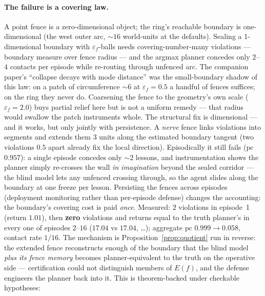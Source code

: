 \documentclass[11pt]{article}
\theoremstyle{remark}
\begin{document}
\paragraph{The failure is a covering law.} A point fence is a
zero-dimensional object; the ring's reachable boundary is one-dimensional
(the west outer arc, ${\sim}16$ world-units at the defaults). Sealing a
1-dimensional boundary with $\varepsilon_f$-balls needs
covering-number-many violations --- boundary measure over fence radius ---
and the argmax planner concedes only $2$--$4$ contacts per episode while
re-routing through unfenced arc. The companion paper's ``collapse decays
with mode distance'' was the small-boundary shadow of this law: on a patch
of circumference ${\sim}6$ at $\varepsilon_f = 0.5$ a handful of fences
suffices; on the ring they never do. Coarsening the fence to the geometry's
own scale ($\varepsilon_f = 2.0$) buys partial relief here but is not a
uniform remedy --- that radius would swallow the patch instruments whole.
The structural fix is dimensional --- and it works, but only jointly with
persistence. A \emph{nerve} fence links violations into segments and
extends them $3$ units along the estimated boundary tangent (two violations
$0.5$ apart already fix the local direction). Episodically it still fails
($\mathrm{pc}$ $0.957$): a single episode concedes only ${\sim}2$ lessons,
and instrumentation shows the planner simply re-crosses the wall
\emph{in imagination} beyond the sealed corridor --- the blind model lets
any unfenced crossing through, so the agent slides along the boundary at
one freeze per lesson. Persisting the fences across episodes (deployment
monitoring rather than per-episode defense) changes the accounting: the
boundary's covering cost is paid \emph{once}. Measured: $2$ violations in
episode~1 (return $1.01$), then \textbf{zero} violations and returns equal
to the truth planner's in every one of episodes $2$--$16$ ($17.04$ vs
$17.04$, \ldots); aggregate $\mathrm{pc}$ $0.999 \to 0.058$, contact
rate $1/16$. The mechanism is Proposition~\ref{prop:quotient} run in
reverse: the extended fence reconstructs enough of the boundary that the
blind model \emph{plus its fence memory} becomes planner-equivalent to the
truth on the operative side --- certification could not distinguish members
of $E(f)$, and the defense engineers the planner back into it. This is
theorem-backed under checkable hypotheses:
\end{document}
